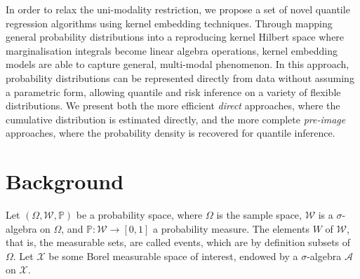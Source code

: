 \documentclass[twoside]{article} \usepackage{aistats2017}
\theoremstyle{definition}
\theoremstyle{theorem}
\begin{document}

	In order to relax the uni-modality restriction, we propose a set of novel quantile regression algorithms using kernel embedding techniques. Through mapping general probability distributions into a reproducing kernel Hilbert space where marginalisation integrals become linear algebra operations, kernel embedding models are able to capture general, multi-modal phenomenon. In this approach, probability distributions can be represented directly from data without assuming a parametric form, allowing quantile and risk inference on a variety of flexible distributions. We present both the more efficient \textit{direct} approaches, where the cumulative distribution is estimated directly, and the more complete \textit{pre-image} approaches, where the probability density is recovered for quantile inference.

% 
% 

	
\section{Background}
\label{sec:background}
	
%
%
	Let $(\Omega, \mathcal{W}, \mathbb{P})$ be a probability space, where $\Omega$ is the sample space, $\mathcal{W}$ is a $\sigma$-algebra on $\Omega$, and $\mathbb{P} : \mathcal{W} \to [0, 1]$ a probability measure. The elements $W$ of $\mathcal{W}$, that is, the measurable sets, are called events, which are by definition subsets of $\Omega$. Let $\mathcal{X}$ be some Borel measurable space of interest, endowed by a $\sigma$-algebra $\mathcal{A}$ on $\mathcal{X}$.
%
%
	
\end{document}
